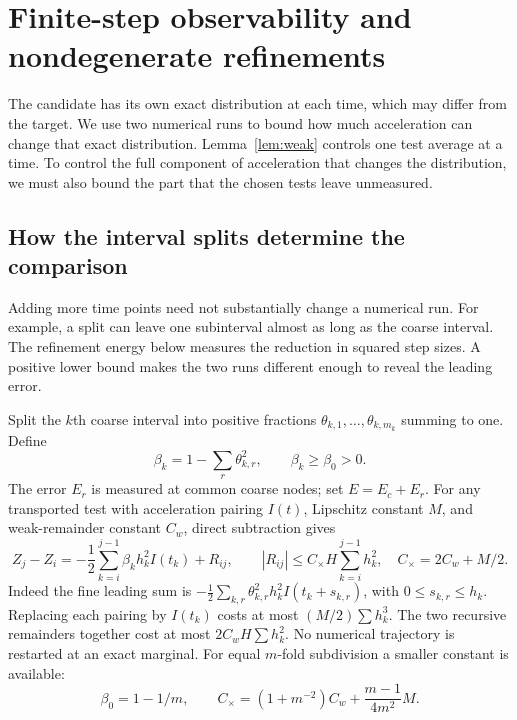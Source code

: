 \section{Finite-step observability and nondegenerate refinements}
\label{app:observable}
The candidate has its own exact distribution at each time, which may
differ from the target. We use two numerical runs to bound how much
acceleration can change that exact distribution. Lemma~\ref{lem:weak}
controls one test average at a time. To control the full component of
acceleration that changes the distribution, we must also bound the
part that the chosen tests leave unmeasured.\AIassistance

\subsection{How the interval splits determine the comparison}
Adding more time points need not substantially change a numerical run.
For example, a split can leave one subinterval almost as long as the coarse
interval. The refinement energy below measures the reduction in squared
step sizes. A positive lower bound makes the two runs different enough to
reveal the leading error.

Split the $k$th coarse interval into positive fractions
$\theta_{k,1},\ldots,\theta_{k,m_k}$ summing to one. Define
\begin{equation}
 \beta_k=1-\sum_r\theta_{k,r}^2,\qquad \beta_k\ge\beta_0>0.
 \label{eq:refinement-energy}
\end{equation}
The error $E_r$ is measured at common coarse nodes; set $E=E_c+E_r$.
For any transported test with acceleration pairing $I(t)$, Lipschitz constant
$M$, and weak-remainder constant $C_w$, direct subtraction gives
\begin{equation}
 Z_j-Z_i=-\frac12\sum_{k=i}^{j-1}\beta_k h_k^2 I(t_k)+R_{ij},
 \qquad |R_{ij}|\le C_\times H\sum_{k=i}^{j-1}h_k^2,
 \quad C_\times=2C_w+M/2.
 \label{eq:balanced-contrast}
\end{equation}
Indeed the fine leading sum is $-\tfrac12\sum_{k,r}
\theta_{k,r}^2h_k^2 I(t_k+s_{k,r})$, with $0\le s_{k,r}\le h_k$.
Replacing each pairing by $I(t_k)$ costs at most $(M/2)\sum h_k^3$.
The two recursive remainders together cost at most $2C_wH\sum h_k^2$.
No numerical trajectory is restarted at an exact marginal. For equal
$m$-fold subdivision a smaller constant is available:
\begin{equation}
 \beta_0=1-1/m,\qquad
 C_\times=(1+m^{-2})C_w+\frac{m-1}{4m^2}M.
 \label{eq:equal-m-constant}
\end{equation}

